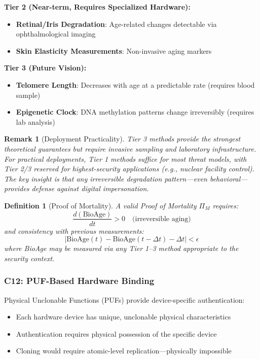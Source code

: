 \documentclass[11pt,a4paper]{article}
\newtheorem{definition}{Definition}
\newtheorem{remark}{Remark}
\begin{document}
\textbf{Tier 2 (Near-term, Requires Specialized Hardware):}
\begin{itemize}
    \item \textbf{Retinal/Iris Degradation}: Age-related changes detectable via ophthalmological imaging
    \item \textbf{Skin Elasticity Measurements}: Non-invasive aging markers
\end{itemize}

\textbf{Tier 3 (Future Vision):}
\begin{itemize}
    \item \textbf{Telomere Length}: Decreases with age at a predictable rate (requires blood sample)
    \item \textbf{Epigenetic Clock}: DNA methylation patterns change irreversibly (requires lab analysis)
\end{itemize}

\begin{remark}[Deployment Practicality]
Tier 3 methods provide the strongest theoretical guarantees but require invasive sampling and laboratory infrastructure.
For practical deployments, Tier 1 methods suffice for most threat models, with Tier 2/3 reserved for highest-security applications (e.g., nuclear facility control).
The key insight is that \emph{any} irreversible degradation pattern---even behavioral---provides defense against digital impersonation.
\end{remark}

\begin{definition}[Proof of Mortality]
A valid Proof of Mortality $\Pi_M$ requires:
\begin{equation}
\frac{d(\text{BioAge})}{dt} > 0 \quad \text{(irreversible aging)}
\end{equation}
and consistency with previous measurements:
\begin{equation}
|\text{BioAge}(t) - \text{BioAge}(t-\Delta t) - \Delta t| < \epsilon
\end{equation}
where BioAge may be measured via any Tier 1--3 method appropriate to the security context.
\end{definition}

\subsubsection{C12: PUF-Based Hardware Binding}

Physical Unclonable Functions (PUFs) provide device-specific authentication:
\begin{itemize}
    \item Each hardware device has unique, unclonable physical characteristics
    \item Authentication requires physical possession of the specific device
    \item Cloning would require atomic-level replication---physically impossible
\end{itemize}
\end{document}
